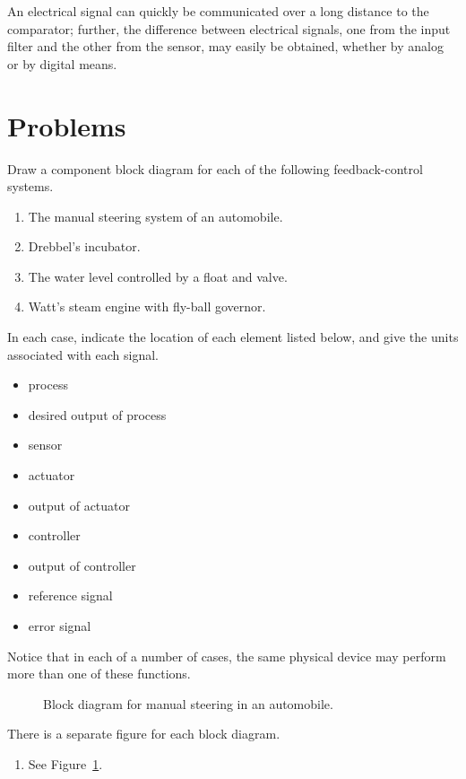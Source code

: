 \begin{solution}
   An electrical signal can quickly be communicated over a long distance to the
   comparator; further, the difference between electrical signals, one from the
   input filter and the other from the sensor, may easily be obtained, whether
   by analog or by digital means.
\end{solution}

\section{Problems}

\begin{problem}
   Draw a component block diagram for each of the following feedback-control
   systems.
   \begin{enumerate}
      \setlength\itemsep{-0.3em}
      \item The manual steering system of an automobile.
      \item Drebbel's incubator.
      \item The water level controlled by a float and valve.
      \item Watt's steam engine with fly-ball governor.
   \end{enumerate}
   In each case, indicate the location of each element listed below, and give
   the units associated with each signal.
   \begin{itemize}
      \setlength\itemsep{-0.3em}
      \item process
      \item desired output of process
      \item sensor
      \item actuator
      \item output of actuator
      \item controller
      \item output of controller
      \item reference signal
      \item error signal
   \end{itemize}
   Notice that in each of a number of cases, the same physical device may
   perform more than one of these functions.
\end{problem}

\begin{figure}
   \begin{center}
      \begin{small}
         
      \end{small}
      \caption{Block diagram for manual steering in an automobile.}
      \label{fig:manual-steering}
   \end{center}
\end{figure}

\begin{solution}
   There is a separate figure for each block diagram.
   \begin{enumerate}
      \item See Figure~\ref{fig:manual-steering}.
   \end{enumerate}
\end{solution}

